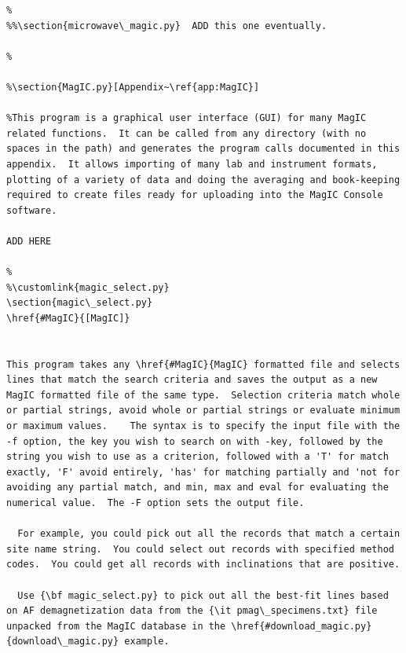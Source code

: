 \documentclass[11pt]{book}
\begin{document}
{{\begin{verbatim}
% 
%%\section{microwave\_magic.py}  ADD this one eventually.

%

%\section{MagIC.py}[Appendix~\ref{app:MagIC}]

%This program is a graphical user interface (GUI) for many MagIC related functions.  It can be called from any directory (with no spaces in the path) and generates the program calls documented in this appendix.  It allows importing of many lab and instrument formats, plotting of a variety of data and doing the averaging and book-keeping required to create files ready for uploading into the MagIC Console software.  

ADD HERE

%
%\customlink{magic_select.py}
\section{magic\_select.py}
\href{#MagIC}{[MagIC]}


This program takes any \href{#MagIC}{MagIC} formatted file and selects lines that match the search criteria and saves the output as a new MagIC formatted file of the same type.  Selection criteria match whole or partial strings, avoid whole or partial strings or evaluate minimum or maximum values.    The syntax is to specify the input file with the -f option, the key you wish to search on with -key, followed by the string you wish to use as a criterion, followed with a 'T' for match exactly, 'F' avoid entirely, 'has' for matching partially and 'not for avoiding any partial match, and min, max and eval for evaluating the numerical value.  The -F option sets the output file.  

  For example, you could pick out all the records that match a certain site name string.  You could select out records with specified method codes.  You could get all records with inclinations that are positive.   
  
  Use {\bf magic_select.py} to pick out all the best-fit lines based on AF demagnetization data from the {\it pmag\_specimens.txt} file unpacked from the MagIC database in the \href{#download_magic.py}{download\_magic.py} example.
  

\end{verbatim}}}
\end{document}
